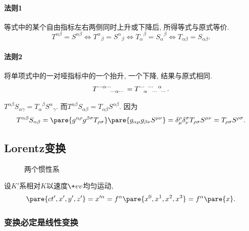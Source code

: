 \documentclass[hidelinks]{ctexart}
\begin{document}
\paragraph{法则1} %
\label{par:法则1}

等式中的某个自由指标左右两侧同时上升或下降后, 所得等式与原式等价.
\[ T^{\alpha\beta} = S^{\alpha\beta} \Leftrightarrow {T^\alpha}_\beta = {S^\alpha}_\beta \Leftrightarrow {T_\alpha}^\beta = {S_\alpha}^\beta \Leftrightarrow {T_{\alpha\beta}} = {S_{\alpha\beta}}. \]


\paragraph{法则2} %
\label{par:法则2}

将单项式中的一对哑指标中的一个抬升, 一个下降, 结果与原式相同.
\[ \tensor{T}{^{\cdots}^\alpha^{\cdots}_{\cdots}_\alpha_{\cdots}} = \tensor{T}{^{\cdots}_\alpha^{\cdots}_{\cdots}^\alpha_{\cdots}}. \]


\begin{ex}
    $T^{\alpha\beta} S_{\alpha\gamma} = {T_\alpha}^\beta{S^\alpha}_\gamma$. 而$T^{\alpha\beta}S_{\alpha\beta} = T_{\alpha\beta}S^{\alpha\beta}$. 因为
    \[ T^{\alpha\beta}S_{\alpha\beta} = \pare{g^{\alpha\rho}g^{\beta\sigma}T_{\rho\sigma}}\pare{g_{\alpha\mu}g_{\beta\nu}S^{\mu\nu}} = \delta_\mu^\rho \delta_\nu^\sigma T_{\rho\sigma}S^{\mu\nu} = T_{\rho\sigma}S^{\rho\sigma}. \]
\end{ex}



\subsection{Lorentz变换} %
\label{sub:lorentz变换}

\begin{figure}[ht]
    \centering
    \caption{两个惯性系}
\end{figure}

设$K'$系相对$K$以速度$\+vv$均匀运动,
\[ \pare{ct',x',y',z'} = x'^\alpha = f^\alpha\pare{x^0,x^1,x^2,x^3} = f^\alpha\pare{x}. \]

\subsubsection{变换必定是线性变换} %
\label{ssub:变换必定是线性变换}
\end{document}
